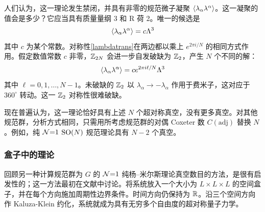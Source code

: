 人们认为，这一理论发生禁闭，并具有非零的规范微子凝聚 $\langle\lambda_\alpha\lambda^\alpha\rangle$。这一凝聚的值会是多少？它应当具有质量量纲 3 和 R 荷 2。唯一的候选是
\begin{equation}
\langle\lambda_\alpha\lambda^\alpha\rangle=c \Lambda^3
\end{equation}
其中 $c$ 为某个常数。对称性\eqref{lambdatrans}在两边都以乘上 $e^{2\pi i/N}$ 的相同方式作用。假定数值常数 $c$ 非零，$\mathbb{Z}_{2N}$ 会进一步自发破缺为 $\mathbb{Z}_2$，产生 $N$ 个不同的解：
\begin{equation}
\langle\lambda_\alpha\lambda^\alpha\rangle=c e^{2\pi i \ell/N } \Lambda^3
\end{equation}
其中 $\ell=0,1,\ldots,N-1$。未破缺的 $\mathbb{Z}_2$ 以 $\lambda_\alpha\to-\lambda_\alpha$ 作用于费米子，这对应于 $360^\circ$ 转动。这一 $\mathbb{Z}_2$ 对称性很难破缺。

现在普遍认为，这一理论恰好具有上述 $N$ 个超对称真空，没有更多真空。对其他规范群，分析方式相同，只需用所考虑规范群的对偶 Coxeter 数 $C(\text{adj})$ 替换 $N$。例如，纯 $\mathcal{N}{=}1$ $\mathop{\mathrm{SO}}(N)$ 规范理论具有 $N-2$ 个真空。

\subsubsection{盒子中的理论}\label{sec:box}
回顾另一种计算规范群为 $G$ 的 $\mathcal{N}{=}1$ 纯杨--米尔斯理论真空数目的方法，是很有启发性的；这一方法最初在文献\cite{Witten:1982df}中讨论。将系统放入一个大小为 $L\times L\times L$ 的空间盒子，并在每个方向施加周期性边界条件。时间方向仍保持为 $\mathbb{R}$。沿三个空间方向作 Kaluza-Klein 约化，系统就成为具有无穷多个自由度的超对称量子力学。

